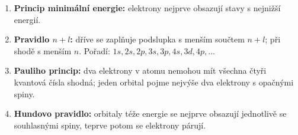 \begin{enumerate}
\item \textbf{Princip minimální energie:} elektrony nejprve obsazují stavy s nejnižší energií.
\item \textbf{Pravidlo $n+l$:} dříve se zaplňuje podslupka s menším součtem $n+l$; při shodě s menším $n$. Pořadí: $1s,2s,2p,3s,3p,4s,3d,4p,\ldots$
\item \textbf{Pauliho princip:} dva elektrony v atomu nemohou mít všechna čtyři kvantová čísla shodná; jeden orbital pojme nejvýše dva elektrony s opačnými spiny.
\item \textbf{Hundovo pravidlo:} orbitaly téže energie se nejprve obsazují jednotlivě se souhlasnými spiny, teprve potom se elektrony párují.
\end{enumerate}
